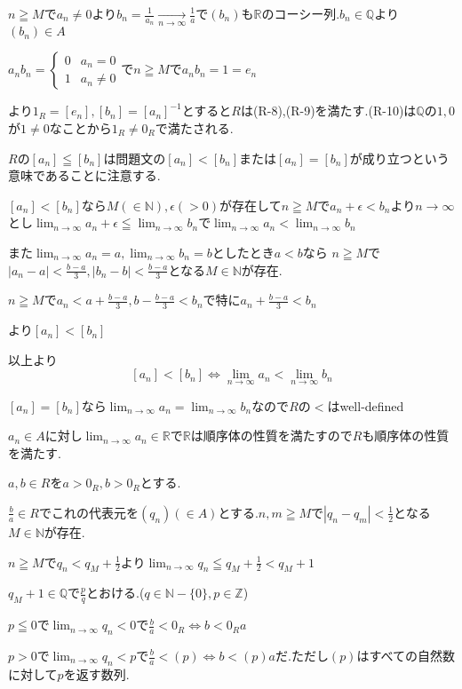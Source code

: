 \documentclass{jsarticle}
\begin{document}
$n\geqq M$で$a_n \neq 0$より$b_n=\frac{1}{a_n}\xrightarrow[n\to\infty]{} \frac{1}{a}$で$(b_n)$も$\mathbb{R}$のコーシー列.$b_n\in\mathbb{Q}$より$(b_n)\in A$

$a_nb_n=\begin{cases}
0 & a_n = 0\\
1 & a_n\neq 0
\end{cases}$で$n\geqq M$で$a_nb_n=1=e_n$

より$1_R=[e_n],[b_n]=[a_n]^{-1}$とすると$R$は(R-8),(R-9)を満たす.(R-10)は$\mathbb{Q}$の$1,0$が$1\neq 0$なことから$1_R\neq 0_R$で満たされる.

$R$の$[a_n]\leqq [b_n]$は問題文の$[a_n]<[b_n]$または$[a_n]=[b_n]$が成り立つという意味であることに注意する.

$[a_n]<[b_n]$なら$M(\in\mathbb{N}),\epsilon (>0)$が存在して$n\geqq M$で$a_n+\epsilon < b_n$より$n\to\infty$とし$\displaystyle \lim_{n\to\infty} a_n +\epsilon \leqq \lim_{n\to\infty}b_n$で$\displaystyle \lim_{n\to\infty} a_n < \lim_{n\to\infty}b_n$

また$\displaystyle \lim_{n\to\infty} a_n=a, \lim_{n\to\infty}b_n=b$としたとき$a<b$なら
$n\geqq M$で$|a_n-a|<\frac{b-a}{3},|b_n-b|<\frac{b-a}{3}$となる$M\in\mathbb{N}$が存在.

$n\geqq M$で$a_n<a+\frac{b-a}{3},b-\frac{b-a}{3}<b_n$で特に$a_n+\frac{b-a}{3}<b_n$

より$[a_n]<[b_n]$

以上より\[[a_n]<[b_n] \Leftrightarrow \lim_{n\to\infty}a_n<\lim_{n\to\infty}b_n\]

$[a_n]=[b_n]$なら$\displaystyle \lim_{n\to\infty}a_n = \lim_{n\to\infty}b_n$なので$R$の$<$はwell-defined

$a_n \in A$に対し$\displaystyle \lim_{n\to\infty}a_n \in \mathbb{R}$で$\mathbb{R}$は順序体の性質を満たすので$R$も順序体の性質を満たす.

$a,b\in R$を$a>0_R,b>0_R$とする.

$\frac{b}{a}\in R$でこれの代表元を$(q_n) (\in A)$とする.$n,m\geqq M$で$|q_n-q_m|<\frac{1}{2}$となる$M\in\mathbb{N}$が存在.

$n\geqq M$で$q_n < q_M+\frac{1}{2}$より$\displaystyle \lim_{n\to\infty} q_n \leqq q_M+\frac{1}{2} < q_M+1$

$q_M+1\in\mathbb{Q}$で$\frac{p}{q}$とおける.($q\in\mathbb{N}-\{0\},p\in\mathbb{Z}$)

$p\leqq 0$で$\displaystyle \lim_{n\to\infty} q_n < 0$で$\frac{b}{a} < 0_R\Leftrightarrow b < 0_Ra$

$p>0$で$\displaystyle \lim_{n\to\infty} q_n < p$で$\frac{b}{a} < (p)\Leftrightarrow b < (p)a$だ.ただし$(p)$はすべての自然数に対して$p$を返す数列.
\end{document}
